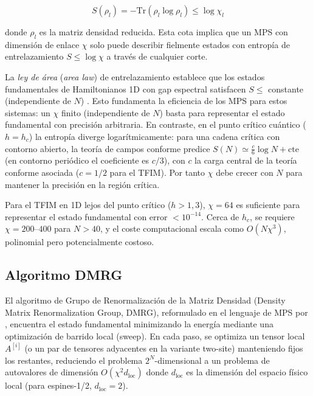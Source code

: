 \documentclass[11pt,a4paper,spanish]{book}
\begin{document}
\begin{equation}
S(\rho_l) = -\text{Tr}(\rho_l \log \rho_l) \leq \log \chi_l
\label{eq:entanglement_bound}
\end{equation}

\noindent donde $\rho_l$ es la matriz densidad reducida. Esta cota implica que un MPS con dimensión de enlace $\chi$ solo puede describir fielmente estados con entropía de entrelazamiento $S \leq \log \chi$ a través de cualquier corte.

La \emph{ley de área} (\emph{area law}) de entrelazamiento establece que los estados fundamentales de Hamiltonianos 1D con gap espectral satisfacen $S \leq$ constante (independiente de $N$) \citep{schollwock2011}. Esto fundamenta la eficiencia de los MPS para estos sistemas: un $\chi$ finito (independiente de $N$) basta para representar el estado fundamental con precisión arbitraria. En contraste, en el punto crítico cuántico ($h = h_c$) la entropía diverge logarítmicamente: para una cadena crítica con contorno abierto, la teoría de campos conforme predice $S(N) \simeq \frac{c}{6} \log N + \text{cte}$ (en contorno periódico el coeficiente es $c/3$), con $c$ la carga central de la teoría conforme asociada ($c = 1/2$ para el TFIM). Por tanto $\chi$ debe crecer con $N$ para mantener la precisión en la región crítica.

Para el TFIM en 1D lejos del punto crítico ($h > 1,3$), $\chi = 64$ es suficiente para representar el estado fundamental con error $< 10^{-14}$. Cerca de $h_c$, se requiere $\chi = 200$--$400$ para $N > 40$, y el coste computacional escala como $O(N \chi^3)$, polinomial pero potencialmente costoso.

\subsection{Algoritmo DMRG}

El algoritmo de Grupo de Renormalización de la Matriz Densidad (Density Matrix Renormalization Group, DMRG), reformulado en el lenguaje de MPS por \citet{schollwock2011}, encuentra el estado fundamental minimizando la energía mediante una optimización de barrido local (sweep). En cada paso, se optimiza un tensor local $A^{[i]}$ (o un par de tensores adyacentes en la variante two-site) manteniendo fijos los restantes, reduciendo el problema $2^N$-dimensional a un problema de autovalores de dimensión $O(\chi^2 d_{\text{loc}})$ donde $d_{\text{loc}}$ es la dimensión del espacio físico local (para espines-1/2, $d_{\text{loc}} = 2$).
\end{document}
